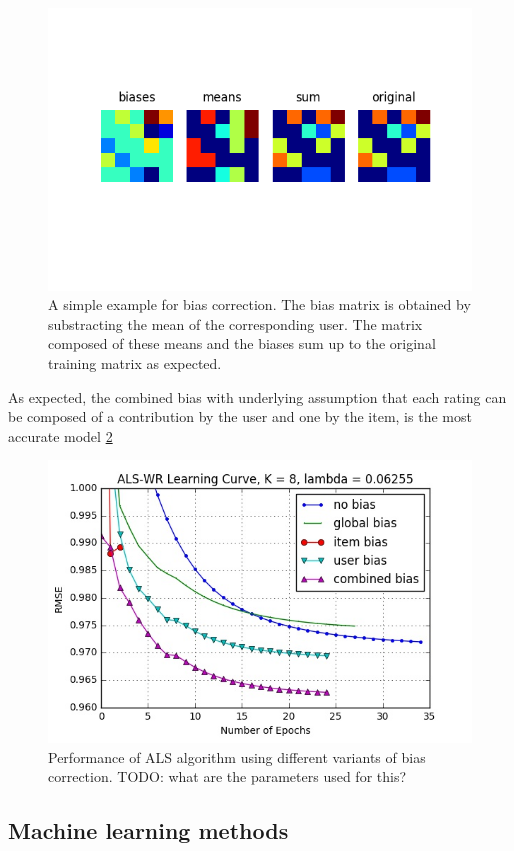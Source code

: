 \begin{figure}[htbp]
  \centering
  \includegraphics[width=.7\columnwidth]{figures/biases_user.png}
  \vspace{-3mm}
  \caption{A simple example for bias correction. The bias matrix is obtained by
  substracting the mean of the corresponding user. The matrix composed of these
  means and the biases sum up to the original training matrix as expected.}
  \label{fig:matrix}
\end{figure}

As expected, the combined bias with underlying assumption that each rating can
  be composed of a contribution by the user and one by the item, is the most
  accurate model \ref{fig:bias} 

\begin{figure}[htbp]
  \centering
  \includegraphics[width=.7\columnwidth]{figures/bias.jpg}
  \vspace{-3mm}
  \caption{Performance of ALS algorithm using different variants of bias
  correction. TODO: what are the parameters used for this? }
  \label{fig:bias}
\end{figure}

\subsection{Machine learning methods}
\label{sec:methods}

